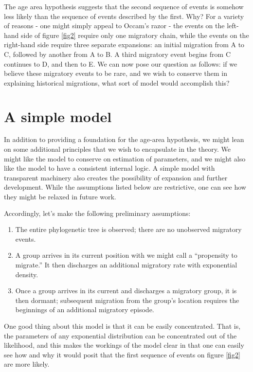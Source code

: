 \documentclass[11pt]{article}
\begin{document}
The age area hypothesis suggests that the second sequence of events is somehow less likely than the sequence of events described by the first. Why? For a variety of reasons - one might simply appeal to Occam's razor - the events on the left-hand side of figure \ref{fig2} require only one migratory chain, while the events on the right-hand side require three separate expansions: an initial migration from A to C, followed by another from A to B. A third migratory event begins from C continues to D, and then to E. We can now pose our question as follows: if we believe these migratory events to be rare, and we wish to conserve them in explaining historical migrations, what sort of model would accomplish this?

\section{A simple model}

In addition to providing a foundation for the age-area hypothesis, we might lean on some additional principles that we wish to encapsulate in the theory. We might like the model to conserve on estimation of parameters, and we might also like the model to have a consistent internal logic. A simple model with transparent machinery also creates the possibility of expansion and further development. While the assumptions listed below are restrictive, one can see how they might be relaxed in future work.

Accordingly, let's make the following preliminary assumptions:
\begin{enumerate}
\item The entire phylogenetic tree is observed; there are no unobserved migratory events.
\item A group arrives in its current position with we might call a ``propensity to migrate.'' It then discharges an additional migratory rate with exponential density.
\item Once a group arrives in its current and discharges a migratory group, it is then dormant; subsequent migration from the group's location requires the beginnings of an additional migratory episode.
\end{enumerate}

One good thing about this model is that it can be easily concentrated. That is, the parameters of any exponential distribution can be concentrated out of the likelihood, and this makes the workings of the model clear in that one can easily see how and why it would posit that the first sequence of events on figure \ref{fig2} are more likely.
\end{document}
